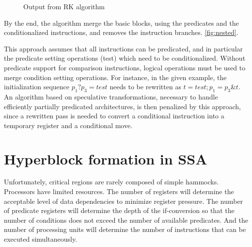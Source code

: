 \begin{figure}
\footnotesize
\caption{Output from RK algorithm}
\label{fig:RK}
\end{figure}

By the end, the algorithm merge the basic blocks, using the predicates and the conditionalized instructions, and removes the instruction branches. \ref{fig:nested}. 

This approach assumes that all instructions can be predicated, and in particular the predicate setting operations (test) which need to be conditionalized. Without predicate support for comparison instructions, logical operations must be used to merge condition setting operations. For instance, in the given example, the initialization sequence $p_1 ? p_3=test$ needs to be rewritten as $t=test; p_1=p_3 \& t$. An algorithm based on speculative transformations, necessary to handle efficiently partially predicated architectures, is then penalized by this approach, since a rewritten pass is needed to convert a conditional instruction into a temporary register and a conditional move.

\section{Hyperblock formation in SSA}

Unfortunately, critical regions are rarely composed of simple hammocks. Processors have limited resources. The number of registers will determine the acceptable level of data dependencies to minimize register pressure. The number of predicate registers will determine the depth of the if-conversion so that the number of conditions does not exceed the number of available predicates. And the number of processing units will determine the number of instructions that can be executed simultaneously.

